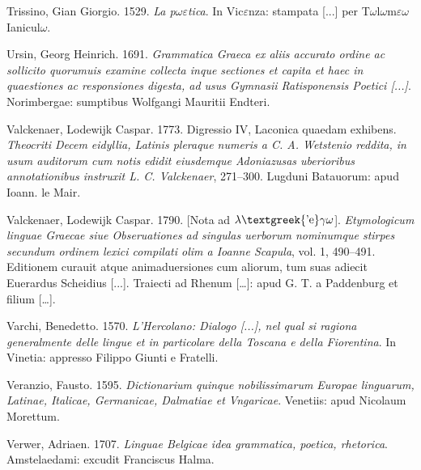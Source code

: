 \begin{styleStandard}
Trissino, Gian Giorgio. 1529. \textit{La p$\omega \varepsilon $tica}. In Vic$\varepsilon $nza: stampata [...] per T$\omega $l$\omega $m$\varepsilon \omega $ Ianicul$\omega $.
\end{styleStandard}

\begin{styleStandard}
Ursin, Georg Heinrich. 1691. \textit{Grammatica Graeca ex aliis accurato ordine ac sollicito quorumuis examine collecta inque sectiones et capita et haec in quaestiones ac responsiones digesta, ad usus Gymnasii Ratisponensis Poetici [...]}. Norimbergae: sumptibus Wolfgangi Mauritii Endteri.
\end{styleStandard}

\begin{styleStandard}
Valckenaer, Lodewijk Caspar. 1773. Digressio IV, Laconica quaedam exhibens. \textit{Theocriti Decem eidyllia, Latinis pleraque numeris a C. A. Wetstenio reddita, in usum auditorum cum notis edidit eiusdemque Adoniazusas uberioribus annotationibus instruxit L. C. Valckenaer}, 271–300. Lugduni Batauorum: apud Ioann. le Mair.
\end{styleStandard}

\begin{styleStandard}
Valckenaer, Lodewijk Caspar. 1790. [Nota ad $\lambda \text{\textgreek{'e}}\gamma \omega $]. \textit{Etymologicum linguae Graecae siue Obseruationes ad singulas uerborum nominumque stirpes secundum ordinem lexici compilati olim a Ioanne Scapula}, vol. 1, 490–491. Editionem curauit atque animaduersiones cum aliorum, tum suas adiecit Euerardus Scheidius [...]. Traiecti ad Rhenum […]: apud G. T. a Paddenburg et filium […].
\end{styleStandard}

\begin{styleStandard}
Varchi, Benedetto. 1570. \textit{L’Hercolano: Dialogo [...], nel qual si ragiona generalmente delle lingue et in particolare della Toscana e della Fiorentina}. In Vinetia: appresso Filippo Giunti e Fratelli.
\end{styleStandard}

\begin{styleStandard}
Veranzio, Fausto. 1595. \textit{Dictionarium quinque nobilissimarum Europae linguarum, Latinae, Italicae, Germanicae, Dalmatiae et Vngaricae}. Venetiis: apud Nicolaum Morettum.
\end{styleStandard}

\begin{styleStandard}
Verwer, Adriaen. 1707. \textit{Linguae Belgicae idea grammatica, poetica, rhetorica}. Amstelaedami: excudit Franciscus Halma.
\end{styleStandard}

